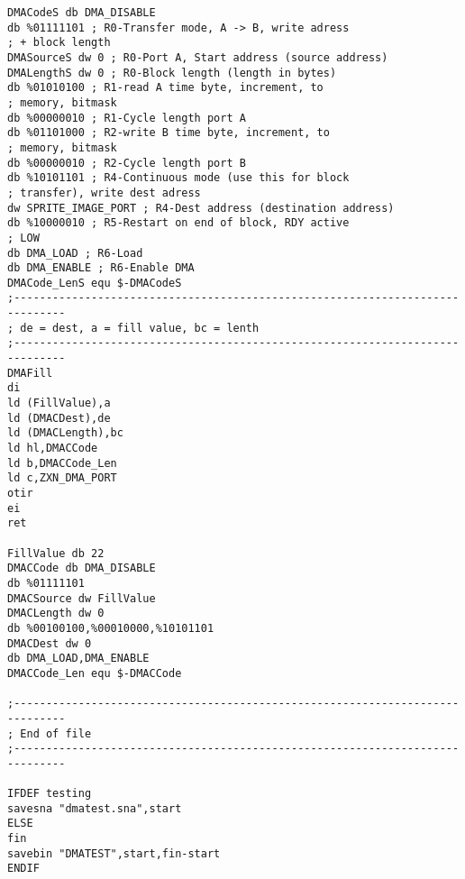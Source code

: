 \begin{enumerate}
\begin{verbatim}
DMACodeS db DMA_DISABLE
db %01111101 ; R0-Transfer mode, A -> B, write adress
; + block length
DMASourceS dw 0 ; R0-Port A, Start address (source address)
DMALengthS dw 0 ; R0-Block length (length in bytes)
db %01010100 ; R1-read A time byte, increment, to
; memory, bitmask
db %00000010 ; R1-Cycle length port A
db %01101000 ; R2-write B time byte, increment, to
; memory, bitmask
db %00000010 ; R2-Cycle length port B
db %10101101 ; R4-Continuous mode (use this for block
; transfer), write dest adress
dw SPRITE_IMAGE_PORT ; R4-Dest address (destination address)
db %10000010 ; R5-Restart on end of block, RDY active
; LOW
db DMA_LOAD ; R6-Load
db DMA_ENABLE ; R6-Enable DMA
DMACode_LenS equ $-DMACodeS
;------------------------------------------------------------------------------
; de = dest, a = fill value, bc = lenth
;------------------------------------------------------------------------------
DMAFill
di
ld (FillValue),a
ld (DMACDest),de
ld (DMACLength),bc
ld hl,DMACCode
ld b,DMACCode_Len
ld c,ZXN_DMA_PORT
otir
ei
ret

FillValue db 22
DMACCode db DMA_DISABLE
db %01111101
DMACSource dw FillValue
DMACLength dw 0
db %00100100,%00010000,%10101101
DMACDest dw 0
db DMA_LOAD,DMA_ENABLE
DMACCode_Len equ $-DMACCode

;------------------------------------------------------------------------------
; End of file
;------------------------------------------------------------------------------

IFDEF testing
savesna "dmatest.sna",start
ELSE
fin
savebin "DMATEST",start,fin-start
ENDIF
\end{verbatim}
\end{enumerate}
